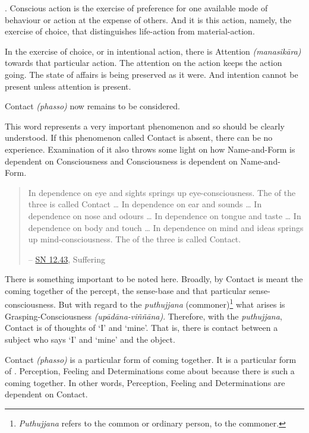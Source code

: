 . Conscious action is the exercise of preference for one available mode of behaviour or action at the expense of others. And it is this action, namely, the exercise of choice, that distinguishes life-action from material-action.

In the exercise of choice, or in intentional action, there is Attention \emph{(manasikāra)} towards that particular action. The attention on the action keeps the action going. The state of affairs is being preserved as it were. And intention cannot be present unless attention is present.

Contact \emph{(phasso)} now remains to be considered.

This word represents a very important phenomenon and so should be clearly understood. If this phenomenon called Contact is absent, there can be no experience. Examination of it also throws some light on how Name-and-Form is dependent on Consciousness and Consciousness is dependent on Name-and- Form.

\begin{quote}
In dependence on eye and sights springs up eye-consciousness. The  of the three is called Contact \ldots{} In dependence on ear and sounds \ldots{} In dependence on nose and odours \ldots{} In dependence on tongue and taste \ldots{} In dependence on body and touch \ldots{} In dependence on mind and ideas springs up mind-consciousness. The  of the three is called Contact.

 -- \href{https://suttacentral.net/sn12.43/en/bodhi}{SN 12.43}, Suffering
\end{quote}

There is something important to be noted here. Broadly, by Contact is meant the coming together of the percept, the sense-base and that particular sense-consciousness. But with regard to the \emph{puthujjana} (commoner)\footnote{\emph{Puthujjana} refers to the common or ordinary person, to the commoner.} what arises is Grasping-Consciousness \emph{(upādāna-viññāna)}. Therefore, with the \emph{puthujjana}, Contact is  of thoughts of `I' and `mine'. That is, there is contact between a subject who says `I' and `mine' and the object.

Contact \emph{(phasso)} is a particular form of coming together. It is a particular form of . Perception, Feeling and Determinations come about because there is such a coming together. In other words, Perception, Feeling and Determinations are dependent on Contact.

